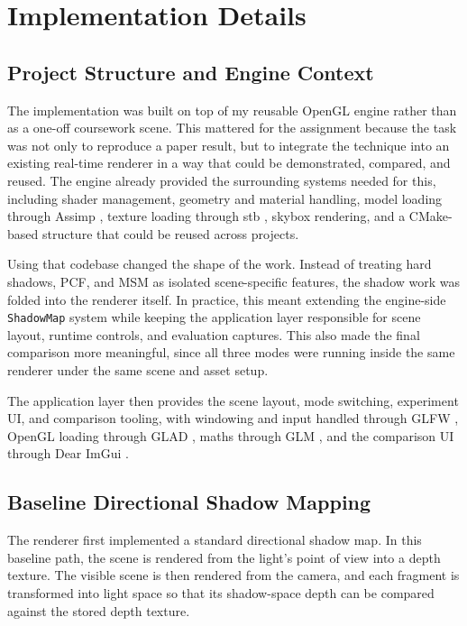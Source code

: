 \section{Implementation Details}

\subsection{Project Structure and Engine Context}

The implementation was built on top of my reusable OpenGL engine \cite{openglengine} rather than as a one-off coursework scene. This mattered for the assignment because the task was not only to reproduce a paper result, but to integrate the technique into an existing real-time renderer in a way that could be demonstrated, compared, and reused. The engine already provided the surrounding systems needed for this, including shader management, geometry and material handling, model loading through Assimp \cite{assimp}, texture loading through stb \cite{stb}, skybox rendering, and a CMake-based structure that could be reused across projects.

Using that codebase changed the shape of the work. Instead of treating hard shadows, PCF, and MSM as isolated scene-specific features, the shadow work was folded into the renderer itself. In practice, this meant extending the engine-side \texttt{ShadowMap} system while keeping the application layer responsible for scene layout, runtime controls, and evaluation captures. This also made the final comparison more meaningful, since all three modes were running inside the same renderer under the same scene and asset setup.

The application layer then provides the scene layout, mode switching, experiment UI, and comparison tooling, with windowing and input handled through GLFW \cite{glfw}, OpenGL loading through GLAD \cite{glad}, maths through GLM \cite{glm}, and the comparison UI through Dear ImGui \cite{imgui}.

\subsection{Baseline Directional Shadow Mapping}

The renderer first implemented a standard directional shadow map. In this baseline path, the scene is rendered from the light's point of view into a depth texture. The visible scene is then rendered from the camera, and each fragment is transformed into light space so that its shadow-space depth can be compared against the stored depth texture.

